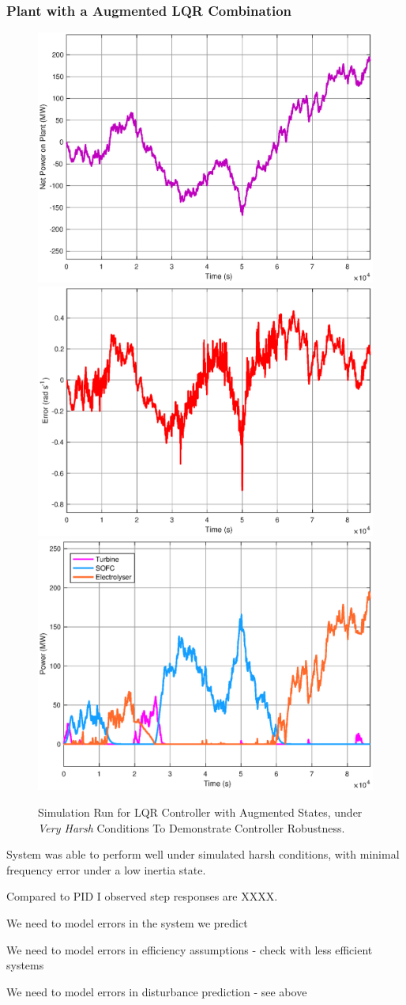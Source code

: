 \subsubsection{Plant with a Augmented LQR Combination}
\begin{figure}[htp]
\centering
\includegraphics[width=.33\textwidth]{images/sim/sim1_disturb.eps}\hfill
\includegraphics[width=.33\textwidth]{images/sim/sim1_omega.eps}\hfill
\includegraphics[width=.33\textwidth]{images/sim/sim1_util.eps}
        \caption{Simulation Run for LQR Controller with Augmented States, under \emph{Very Harsh} Conditions To Demonstrate Controller Robustness.}
        \label{fig:sim1}
\end{figure}
System was able to perform well under simulated harsh conditions, with minimal frequency error under a low inertia state.

Compared to PID I observed step responses are {\color{red}XXXX}.

\begin{itemize}
{\color{red}
\item We need to model errors in the system we predict
\item We need to model errors in efficiency assumptions - check with less efficient systems
\item We need to model errors in disturbance prediction - see above
}
\end{itemize}
